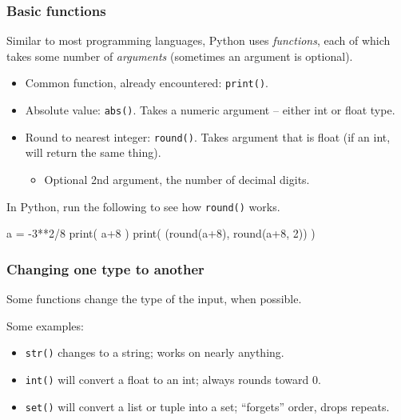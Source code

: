 \documentclass{beamer}
\newenvironment{codeblock}
    {\hfill\begin{beamerboxesrounded}[lower=codecol, width=0.8\textwidth]
    \medskip

    }
    { 
    \end{beamerboxesrounded}\hfill
    }
\theoremstyle{example}
\newcommand{\ttt}[1]{{\small\texttt{#1}}}
\begin{document}
\begin{frame}[fragile]
\frametitle{Basic functions}

Similar to most programming languages, Python uses \emph{functions}, each of which takes some number of \emph{arguments} (sometimes an argument is optional).

\begin{itemize}
	\item Common function, already encountered: \ttt{print()}.
	\item Absolute value: \ttt{abs()}. Takes a numeric argument {--} either {\ttb int} or {\ttb float} type.
	\item Round to nearest integer: \ttt{round()}. Takes argument that is {\ttb float} (if an {\ttb int}, will return the same thing).
	\begin{itemize}
		\item Optional 2nd argument, the number of decimal digits.
	\end{itemize}
\end{itemize}
In Python, run the following to see how \ttt{round()} works.

\begin{codeblock}

\begin{python}
a = -3**2/8
print( a+8 )
print( (round(a+8), round(a+8, 2)) )
\end{python}

\end{codeblock}

\end{frame}

\begin{frame}
\frametitle{Changing one type to another}
Some functions change the type of the input, when possible. 

Some examples:

\begin{itemize}
	\item \ttt{str()} changes to a string; works on nearly anything.
	\item \ttt{int()} will convert a float to an int; always rounds toward 0.
	\item \ttt{set()} will convert a list or tuple into a set; ``forgets'' order, drops repeats.
\end{itemize}
\end{frame}
\end{document}
